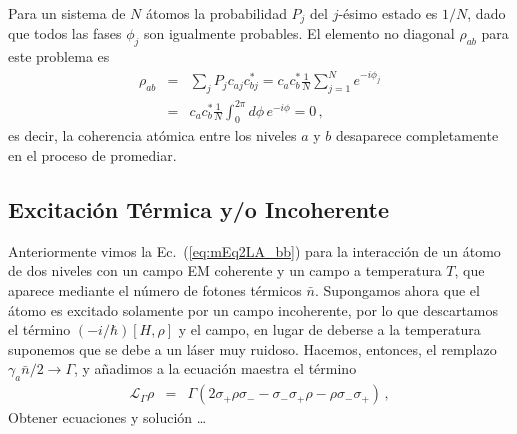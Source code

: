 \documentclass[12pt]{report}
\begin{document}
Para un sistema de $N$ \'atomos la probabilidad $P_j$ del $j$-\'esimo estado 
es $1/N$, dado que todos las fases $\phi_j$ son igualmente probables. El 
elemento no diagonal $\rho_{ab}$ para este problema es 
%
\begin{eqnarray*}
\rho_{ab} &=& \sum_j P_j c_{aj} c_{bj}^\ast 
	= c_a c_b^\ast \frac{1}{N} \sum_{j=1}^N e^{-i \phi_j} 	\\ 
	&=& c_a c_b^\ast \frac{1}{N}  \int_0^{2\pi} d\phi \, e^{-i \phi} = 0 \,,
\end{eqnarray*}
es decir, la coherencia at\'omica entre los niveles $a$ y $b$ desaparece 
completamente en el proceso de promediar. 

\subsection{Excitaci\'on T\'ermica y/o Incoherente} 
Anteriormente vimos la Ec.~(\ref{eq:mEq2LA_bb}) para la interacci\'on 
de un \'atomo de dos niveles con un campo EM coherente y un campo a  
temperatura $T$, que aparece mediante el n\'umero de fotones t\'ermicos 
$\bar{n}$. Supongamos ahora que el \'atomo es excitado solamente por 
un campo incoherente, por lo que descartamos el t\'ermino 
$(-i/\hbar)[H,\rho]$ y el campo, en lugar de deberse a la temperatura 
suponemos que se debe a un l\'aser muy ruidoso. Hacemos, entonces, 
el remplazo $\gamma_a \bar{n}/2 \to \Gamma$, y a\~nadimos a la 
ecuaci\'on maestra el t\'ermino
%
\begin{eqnarray} 	\label{eq:mEq2LA_inc}
\mathcal{L}_{\Gamma} \rho &=& \Gamma   \left( 2 \sigma_+ \rho \sigma_- 
	-\sigma_- \sigma_+ \rho -\rho \sigma_- \sigma_+ \right)\,, 
\end{eqnarray}
Obtener ecuaciones y soluci\'on \ldots

\end{document}
